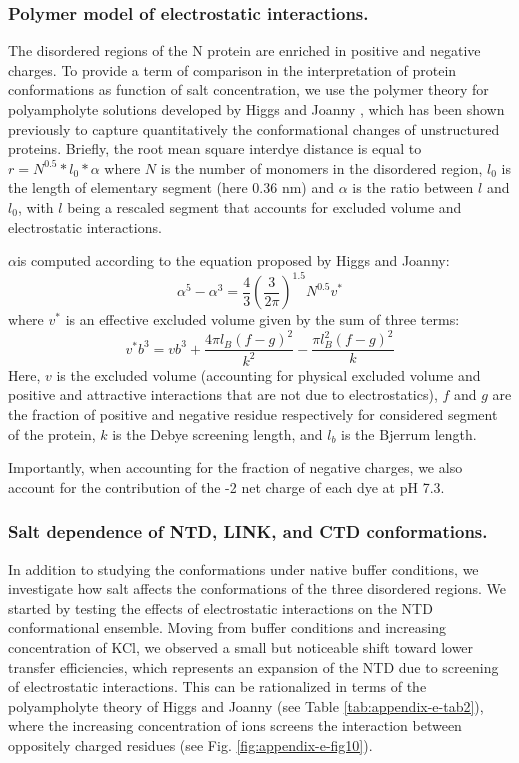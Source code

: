 \documentclass[../main.tex]{subfiles}
\begin{document}
    \subsubsection{Polymer model of electrostatic interactions.}
        The disordered regions of the N protein are enriched in positive and negative charges. To provide a term of comparison in the interpretation of protein conformations as function of salt concentration, we use the polymer theory for polyampholyte solutions developed by Higgs and Joanny \cite{Higgs1991-rl,Muller-Spath2010-oy}, which has been shown previously to capture quantitatively the conformational changes of unstructured proteins. Briefly, the root mean square interdye distance is equal to $r=N^{0.5}*l_{0}*\alpha$ where $N$ is the number of monomers in the disordered region, $l_0$ is the length of elementary segment (here 0.36 nm) and $\alpha$ is the ratio between $l$ and $l_0$, with $l$ being a rescaled segment that accounts for excluded volume and electrostatic interactions.

        $\alpha$is computed according to the equation proposed by Higgs and Joanny\cite{Higgs1991-rl,Muller-Spath2010-oy}: 
        \begin{equation}\label{appendix-e-eq21}
            \alpha^5-\alpha^3 = \frac{4}3(\frac{3}{2\pi})^{1.5}N^{0.5}v^*
        \end{equation}
        where $v^*$ is an effective excluded volume given by the sum of three terms: 
        \begin{equation}\label{appendix-e-eq22}
            v^*b^3=vb^3+\frac{4\pi l_B(f-g)^2}{k^2} - \frac{\pi l^2_B(f-g)^2}{k}
        \end{equation}
        Here, $v$ is the excluded volume (accounting for physical excluded volume and positive and attractive interactions that are not due to electrostatics), $f$ and $g$ are the fraction of positive and negative residue respectively for considered segment of the protein, $k$ is the Debye screening length, and $l_b$ is the Bjerrum length.

        Importantly, when accounting for the fraction of negative charges, we also account for the contribution of the -2 net charge of each dye at pH 7.3.

    \subsubsection{Salt dependence of NTD, LINK, and CTD conformations.}
        In addition to studying the conformations under native buffer conditions, we investigate how salt affects the conformations of the three disordered regions. We started by testing the effects of electrostatic interactions on the NTD conformational ensemble. Moving from buffer conditions and increasing concentration of KCl, we observed a small but noticeable shift toward lower transfer efficiencies, which represents an expansion of the NTD due to screening of electrostatic interactions. This can be rationalized in terms of the polyampholyte theory of Higgs and Joanny\cite{Higgs1991-rl,Muller-Spath2010-oy} (see Table \ref{tab:appendix-e-tab2}), where the increasing concentration of ions screens the interaction between oppositely charged residues (see Fig. \ref{fig:appendix-e-fig10}). 
\end{document}
